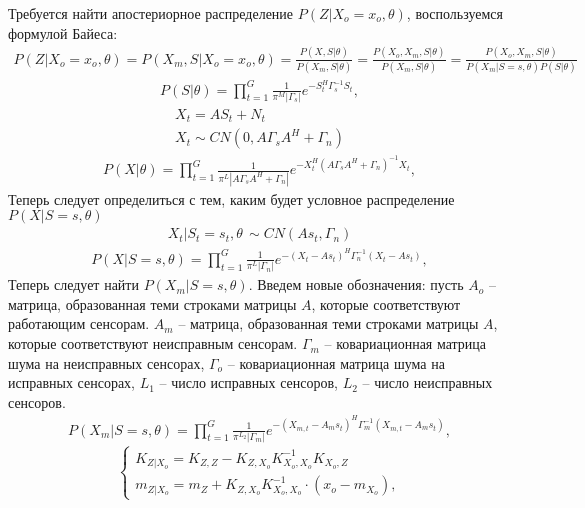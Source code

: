 \documentclass[11pt]{article}
\begin{document}
\begin{center}
\fontsize{16}{20}\selectfont {}
\end{center}
Требуется найти апостериорное распределение $P(Z|X_o=x_o,\theta)$, воспользуемся формулой Байеса:
\begin{gather}
P(Z|X_o=x_o,\theta) = P(X_m, S|X_o=x_o,\theta) = \frac{P(X, S|\theta)}{P(X_m, S|\theta)} = \frac{P(X_o, X_m, S|\theta)}{P(X_m, S|\theta)} = \frac{P(X_o, X_m, S|\theta)}{P(X_m|S=s, \theta)P(S|\theta)} 
\end{gather}
\begin{gather}
P(S|\theta) = \prod_{t=1}^G \frac{1}{\pi^M |\Gamma_s|}e^{-S_t^H\Gamma_s^{-1}S_t},
\end{gather}
\begin{gather*}
X_t = AS_t + N_t \\
X_t \sim CN(0, A\Gamma_s A^H + \Gamma_n)
\end{gather*}
\begin{gather}
P(X|\theta) = \prod_{t=1}^G \frac{1}{\pi^L |A\Gamma_s  A^H + \Gamma_n|}e^{-X_t^H (A\Gamma_s A^H + \Gamma_n)^{-1}X_t},
\end{gather}
Теперь следует определиться с тем, каким будет условное распределение $P(X|S=s, \theta)$
\begin{gather*}
X_t|S_t=s_t, \theta \, \sim CN(A s_t, \Gamma_n)
\end{gather*}
\begin{gather}
P(X|S=s,\theta) = \prod_{t=1}^G \frac{1}{\pi^L |\Gamma_n|}e^{-(X_t-A s_t)^H \Gamma_n^{-1}(X_t-A s_t)},
\end{gather}
Теперь следует найти $P(X_m|S=s, \theta)$. Введем новые обозначения: пусть $A_o$ -- матрица, образованная теми строками матрицы $A$, которые соответствуют работающим сенсорам. $A_m$ -- матрица, образованная теми строками матрицы $A$, которые соответствуют неисправным сенсорам. $\Gamma_m$ -- ковариационная матрица шума на неисправных сенсорах,  $\Gamma_o$ -- ковариационная матрица шума на исправных сенсорах, $L_1$ -- число исправных сенсоров, $L_2$ -- число неисправных сенсоров.
\begin{gather}
P(X_m|S=s,\theta) = \prod_{t=1}^G \frac{1}{\pi^{L_2} |\Gamma_m|}e^{-(X_{m,t}-A_m s_t)^H \Gamma_m^{-1}(X_{m,t}-A_m s_t)},
\end{gather}
\begin{equation}
\left\{ \begin{gathered} 
K_{Z|X_o} = K_{Z,Z}-K_{Z,X_o}K_{X_o,X_o}^{-1}K_{X_o,Z} \\
m_{Z|X_o} = m_{Z} + K_{Z,X_o}K_{X_o,X_o}^{-1}\cdot(x_o-m_{X_o}),
\end{gathered} \right.
\end{equation}
\end{document}
